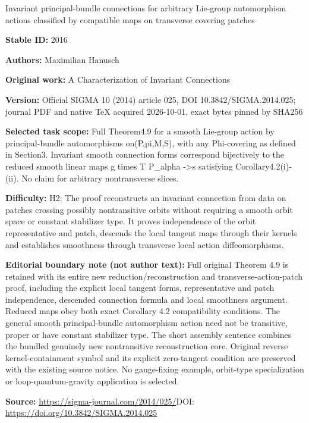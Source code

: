 \documentclass[11pt]{article}
\numberwithin{equation}{section}
\begin{document}
\begin{center}\Large Invariant principal-bundle connections for arbitrary Lie-group automorphism actions classified by compatible maps on transverse covering patches\end{center}
\noindent\textbf{Stable ID:} 2016\par
\noindent\textbf{Authors:} Maximilian Hanusch\par
\noindent\textbf{Original work:} A Characterization of Invariant Connections\par
\noindent\textbf{Version:} Official SIGMA 10 (2014) article 025, DOI 10.3842/SIGMA.2014.025; journal PDF and native TeX acquired 2026-10-01, exact bytes pinned by SHA256\par
\noindent\textbf{Selected task scope:} Full Theorem4.9 for a smooth Lie-group action by principal-bundle automorphisms on(P,pi,M,S), with any Phi-covering as defined in Section3. Invariant smooth connection forms correspond bijectively to the reduced smooth linear maps g times T P\_alpha ->s satisfying Corollary4.2(i)-(ii). No claim for arbitrary nontransverse slices.\par
\noindent\textbf{Difficulty:} H2: The proof reconstructs an invariant connection from data on patches crossing possibly nontransitive orbits without requiring a smooth orbit space or constant stabilizer type. It proves independence of the orbit representative and patch, descends the local tangent maps through their kernels and establishes smoothness through transverse local action diffeomorphisms.\par
\noindent\textbf{Editorial boundary note (not author text):} Full original Theorem 4.9 is retained with its entire new reduction/reconstruction and transverse-action-patch proof, including the explicit local tangent forms, representative and patch independence, descended connection formula and local smoothness argument. Reduced maps obey both exact Corollary 4.2 compatibility conditions. The general smooth principal-bundle automorphism action need not be transitive, proper or have constant stabilizer type. The short assembly sentence combines the bundled genuinely new nontransitive reconstruction core. Original reverse kernel-containment symbol and its explicit zero-tangent condition are preserved with the existing source notice. No gauge-fixing example, orbit-type specialization or loop-quantum-gravity application is selected.\par
\noindent\textbf{Source:} \url{https://sigma-journal.com/2014/025/}\quad DOI: \url{https://doi.org/10.3842/SIGMA.2014.025}\par
\end{document}

